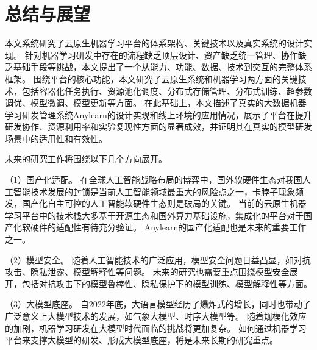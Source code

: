 
\chapter{总结与展望}

本文系统研究了云原生机器学习平台的体系架构、关键技术以及真实系统的设计实现。
针对机器学习研发中存在的流程缺乏顶层设计、资产缺乏统一管理、协作缺乏基础手段等挑战，本文提出了一个从能力、功能、数据、技术到交互的完整体系框架。
围绕平台的核心功能，本文研究了云原生系统和机器学习两方面的关键技术，包括容器化任务执行、资源池化调度、分布式存储管理、分布式训练、超参数调优、模型微调、模型更新等方面。
在此基础上，本文描述了真实的大数据机器学习研发管理系统Anylearn的设计实现和线上环境的应用情况，展示了平台在提升研发协作、资源利用率和实验复现性方面的显著成效，并证明其在真实的模型研发场景中的适用性和有效性。

未来的研究工作将围绕以下几个方向展开。

（1）国产化适配。
在全球人工智能战略布局的博弈中，国外软硬件生态对我国人工智能技术发展的封锁是当前人工智能领域最重大的风险点之一，卡脖子现象频发，国产化自主可控的人工智能软硬件生态则是破局的关键。
当前的云原生机器学习平台中的技术栈大多基于开源生态和国外算力基础设施，集成化的平台对于国产化软硬件的适配性有待充分验证。
Anylearn的国产化适配也是未来的重要工作之一。

（2）模型安全。
随着人工智能技术的广泛应用，模型安全问题日益凸显，如对抗攻击、隐私泄露、模型解释性等问题。
未来的研究也需要重点围绕模型安全展开，包括对抗攻击下的模型鲁棒性、隐私保护下的模型训练、模型解释性等方面。

（3）大模型底座。
自2022年底，大语言模型经历了爆炸式的增长，同时也带动了广泛意义上大模型技术的发展，如气象大模型、时序大模型等。
随着规模化效应的加剧，机器学习研发在大模型时代面临的挑战将更加复杂。
如何通过机器学习平台来支撑大模型的研发、形成大模型底座，将是未来长期的研究重点。
